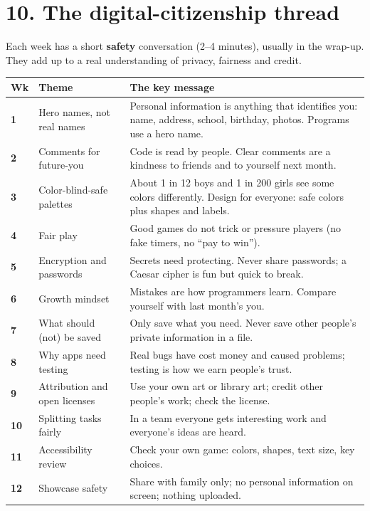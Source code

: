 \documentclass[level=2,teacher]{kidscode}
\begin{document}
\section{10. The digital-citizenship thread}
Each week has a short \textbf{safety} conversation (2--4 minutes), usually in the wrap-up. They add
up to a real understanding of privacy, fairness and credit.

{\small
\begin{longtable}{@{}>{\bfseries}p{0.8cm}>{\raggedright\arraybackslash}p{4.4cm}>{\raggedright\arraybackslash}p{9.4cm}@{}}
\toprule
Wk & Theme & The key message \\ \midrule\endhead
1 & Hero names, not real names & Personal information is anything that identifies you: name, address, school, birthday, photos. Programs use a hero name. \\
2 & Comments for future-you & Code is read by people. Clear comments are a kindness to friends and to yourself next month. \\
3 & Color-blind-safe palettes & About 1 in 12 boys and 1 in 200 girls see some colors differently. Design for everyone: safe colors plus shapes and labels. \\
4 & Fair play & Good games do not trick or pressure players (no fake timers, no \enquote{pay to win}). \\
5 & Encryption and passwords & Secrets need protecting. Never share passwords; a Caesar cipher is fun but quick to break. \\
6 & Growth mindset & Mistakes are how programmers learn. Compare yourself with last month's you. \\
7 & What should (not) be saved & Only save what you need. Never save other people's private information in a file. \\
8 & Why apps need testing & Real bugs have cost money and caused problems; testing is how we earn people's trust. \\
9 & Attribution and open licenses & Use your own art or library art; credit other people's work; check the license. \\
10 & Splitting tasks fairly & In a team everyone gets interesting work and everyone's ideas are heard. \\
11 & Accessibility review & Check your own game: colors, shapes, text size, key choices. \\
12 & Showcase safety & Share with family only; no personal information on screen; nothing uploaded. \\
\bottomrule
\end{longtable}}
\end{document}
